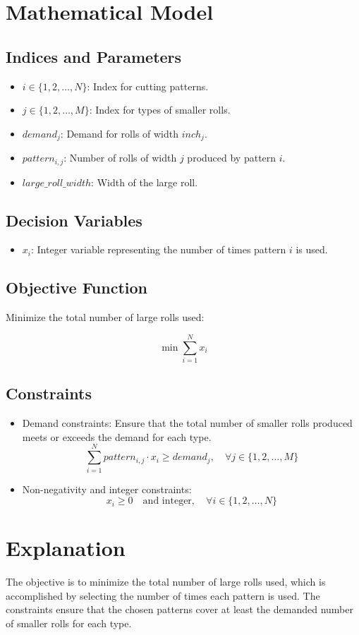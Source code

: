 \documentclass{article}
\begin{document}
\section*{Mathematical Model}

\subsection*{Indices and Parameters}

\begin{itemize}
    \item $i \in \{1, 2, \ldots, N\}$: Index for cutting patterns.
    \item $j \in \{1, 2, \ldots, M\}$: Index for types of smaller rolls.
    \item $demand_j$: Demand for rolls of width $inch_j$.
    \item $pattern_{i,j}$: Number of rolls of width $j$ produced by pattern $i$.
    \item $large\_roll\_width$: Width of the large roll.
\end{itemize}

\subsection*{Decision Variables}

\begin{itemize}
    \item $x_i$: Integer variable representing the number of times pattern $i$ is used.
\end{itemize}

\subsection*{Objective Function}

Minimize the total number of large rolls used:

\[
\min \sum_{i=1}^{N} x_i
\]

\subsection*{Constraints}

\begin{itemize}
    \item Demand constraints: Ensure that the total number of smaller rolls produced meets or exceeds the demand for each type.
    \[
    \sum_{i=1}^{N} pattern_{i,j} \cdot x_i \geq demand_j, \quad \forall j \in \{1, 2, \ldots, M\}
    \]

    \item Non-negativity and integer constraints:
    \[
    x_i \geq 0 \quad \text{and integer}, \quad \forall i \in \{1, 2, \ldots, N\}
    \]
\end{itemize}

\section*{Explanation}

The objective is to minimize the total number of large rolls used, which is accomplished by selecting the number of times each pattern is used. The constraints ensure that the chosen patterns cover at least the demanded number of smaller rolls for each type.
\end{document}
